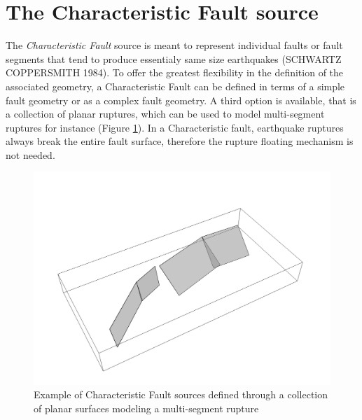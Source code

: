 \section{The Characteristic Fault source}
The \textit{Characteristic Fault} source is meant to represent individual faults or fault segments that tend to
produce essentialy same size earthquakes (SCHWARTZ COPPERSMITH 1984). To offer the greatest flexibility
in the definition of the associated geometry, a Characteristic Fault can be defined in terms of a simple fault
geometry or as a complex fault geometry. A third option is available, that is a collection of planar ruptures,
which can be used to model multi-segment ruptures for instance (Figure \ref{fig:CharacteristicFaultSource}). In a Characteristic fault, earthquake ruptures
always break the entire fault surface, therefore the rupture floating mechanism is not needed.
\begin{figure}
\centering
\includegraphics[width=14cm]{./Pictures/CharacteristicFaultSource.pdf}
\caption{Example of Characteristic Fault sources defined through a collection of planar surfaces modeling a multi-segment rupture}
\label{fig:CharacteristicFaultSource}
\end{figure}
%
%
%

